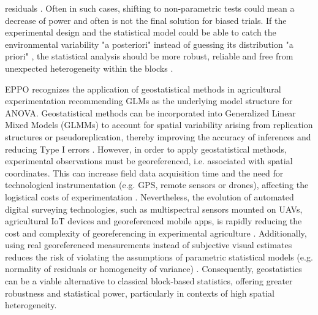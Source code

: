 \documentclass[12pt,a4paper,oneside]{report}
\begin{document}
residuals \cite{schabenbergerStatisticalMethodsSpatial2004,onofriNewMethodAnalysis2010}. 
Often in such cases, 
shifting to non-parametric tests could mean a decrease 
of power \cite{stroupRethinkingAnalysisNonNormal2015,agrestiIntroductionCategoricalData2018}
and often is not the final solution for biased trials.
If the experimental design and the statistical model could be able to catch 
the environmental variability "a posteriori" instead of guessing its distribution "a priori"
\cite{oliverGeostatisticalApplicationsPrecision2010,websterGeostatisticsEnvironmentalScientists2007}, 
the statistical analysis should be more robust, reliable and free from
unexpected heterogeneity within the blocks
\cite{richterGeostatisticalModelsAgricultural2012,lopezEfficiencyIncompleteBlock1995,aquiles_e_effect_2024}.

EPPO recognizes the application of geostatistical methods in agricultural 
experimentation recommending GLMs as the underlying 
model structure for ANOVA.
Geostatistical methods can be incorporated into Generalized Linear Mixed Models 
(GLMMs) to account for spatial variability arising from replication structures 
or pseudoreplication, thereby improving the accuracy of inferences and reducing 
Type I errors
\cite{slaets_linear_2021,millar_remedies_2004,Piepho_2011,schabenbergerStatisticalMethodsSpatial2004,aquiles_e_effect_2024}.
However, in order to apply geostatistical methods, experimental observations must 
be georeferenced, i.e. associated with spatial coordinates. This can increase 
field data acquisition time and the need for technological instrumentation 
(e.g. GPS, remote sensors or drones), affecting the logistical costs of 
experimentation \cite{antoniou_chapter_2023,alexopoulos_complementary_2023,zhao_grain_2011}.
Nevertheless, the evolution of automated digital surveying technologies, 
such as multispectral sensors mounted on UAVs, agricultural IoT devices and 
georeferenced mobile apps, is rapidly reducing the cost and complexity of 
georeferencing in experimental agriculture \cite{cisternas_systematic_2020,mondino_considerazioni_2017}.
Additionally, using real georeferenced measurements instead of subjective 
visual estimates reduces the risk of violating the assumptions of parametric 
statistical models (e.g. normality of residuals or homogeneity of variance) 
\cite{stevenson_overview_2001,acutis_perfunctory_2012,chiang_what_2014}.
Consequently, geostatistics can be a viable alternative to classical 
block-based statistics, offering greater robustness and statistical power, 
particularly in contexts of high spatial heterogeneity.
\end{document}
